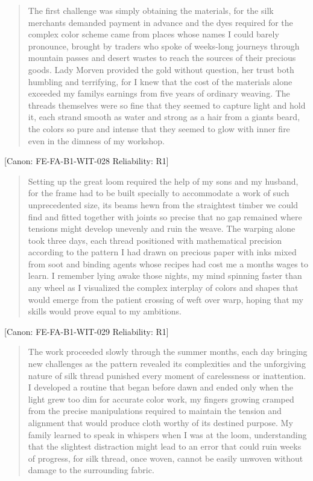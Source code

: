 \begin{quote}
The first challenge was simply obtaining the materials, for the silk
merchants demanded payment in advance and the dyes required for the
complex color scheme came from places whose names I could barely
pronounce, brought by traders who spoke of weeks-long journeys through
mountain passes and desert wastes to reach the sources of their precious
goods. Lady Morven provided the gold without question, her trust both
humbling and terrifying, for I knew that the cost of the materials alone
exceeded my family\textquotesingle s earnings from five years of
ordinary weaving. The threads themselves were so fine that they seemed
to capture light and hold it, each strand smooth as water and strong as
a hair from a giant\textquotesingle s beard, the colors so pure and
intense that they seemed to glow with inner fire even in the dimness of
my workshop.
\end{quote}

{[}Canon: FE-FA-B1-WIT-028 \textbar{} Reliability: R1{]}

\begin{quote}
Setting up the great loom required the help of my sons and my husband,
for the frame had to be built specially to accommodate a work of such
unprecedented size, its beams hewn from the straightest timber we could
find and fitted together with joints so precise that no gap remained
where tensions might develop unevenly and ruin the weave. The warping
alone took three days, each thread positioned with mathematical
precision according to the pattern I had drawn on precious paper with
inks mixed from soot and binding agents whose recipes had cost me a
month\textquotesingle s wages to learn. I remember lying awake those
nights, my mind spinning faster than any wheel as I visualized the
complex interplay of colors and shapes that would emerge from the
patient crossing of weft over warp, hoping that my skills would prove
equal to my ambitions.
\end{quote}

{[}Canon: FE-FA-B1-WIT-029 \textbar{} Reliability: R1{]}

\begin{quote}
The work proceeded slowly through the summer months, each day bringing
new challenges as the pattern revealed its complexities and the
unforgiving nature of silk thread punished every moment of carelessness
or inattention. I developed a routine that began before dawn and ended
only when the light grew too dim for accurate color work, my fingers
growing cramped from the precise manipulations required to maintain the
tension and alignment that would produce cloth worthy of its destined
purpose. My family learned to speak in whispers when I was at the loom,
understanding that the slightest distraction might lead to an error that
could ruin weeks of progress, for silk thread, once woven, cannot be
easily unwoven without damage to the surrounding fabric.
\end{quote}

